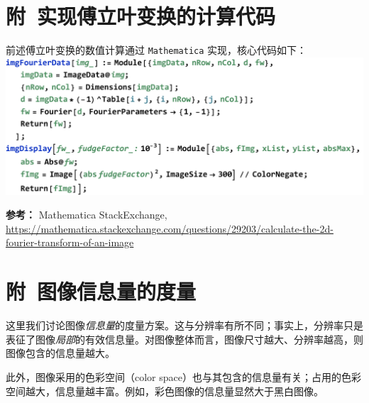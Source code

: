 \documentclass[aps,pre,12pt,preprint,%
	onecolumn,showpacs,showkeys,nofootinbib]{revtex4-1}
\begin{document}
\setlength{\bibsep}{2pt}
\linespread{1.2}\selectfont



\clearpage
\appendix
\section*{附\ 实现傅立叶变换的计算代码}
\linespread{1.5}\selectfont
	前述傅立叶变换的数值计算通过 \verb|Mathematica| 实现，核心代码如下：\\[-1.5ex]
	
	\includegraphics[width=\linewidth]{fourierCode.pdf}
	
	\vspace{.5ex}
	\noindent\textbf{参考：} Mathematica StackExchange, \\[-.8ex] {\hphantom{url:\ \ \ \ }
	\scriptsize\url{https://mathematica.stackexchange.com/questions/29203/calculate-the-2d-fourier-transform-of-an-image}}
\section*{附\ 图像信息量的度量}
	这里我们讨论图像\textit{信息量}的度量方案。这与分辨率有所不同；事实上，分辨率只是表征了图像\textit{局部}的有效信息量。对图像整体而言，图像尺寸越大、分辨率越高，则图像包含的信息量越大。
	
	此外，图像采用的色彩空间（color space）也与其包含的信息量有关；占用的色彩空间越大，信息量越丰富。例如，彩色图像的信息量显然大于黑白图像。
\end{document}
